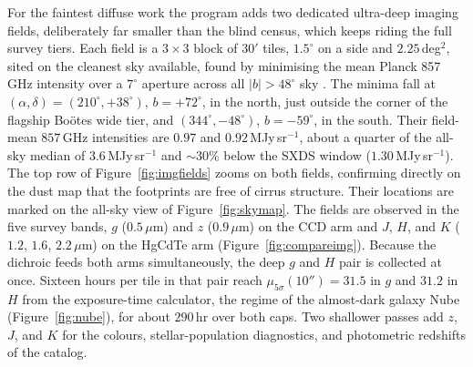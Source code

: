 For the faintest diffuse work the program adds two dedicated ultra-deep imaging fields, deliberately far smaller than the blind census, which keeps riding the full survey tiers. Each field is a $3\times3$ block of $30'$ tiles, $1.5^\circ$ on a side and $2.25$\,deg$^2$, sited on the cleanest sky available, found by minimising the mean Planck 857\,GHz intensity over a $7^\circ$ aperture across all $|b|>48^\circ$ sky \cite{planck2018hfi}. The minima fall at $(\alpha,\delta)=(210^\circ,+38^\circ)$, $b=+72^\circ$, in the north, just outside the corner of the flagship Bo\"otes wide tier, and $(344^\circ,-48^\circ)$, $b=-59^\circ$, in the south. Their field-mean $857$\,GHz intensities are $0.97$ and $0.92$\,MJy\,sr$^{-1}$, about a quarter of the all-sky median of $3.6$\,MJy\,sr$^{-1}$ and $\sim30\%$ below the SXDS window ($1.30$\,MJy\,sr$^{-1}$). The top row of Figure~\ref{fig:imgfields} zooms on both fields, confirming directly on the dust map that the footprints are free of cirrus structure. Their locations are marked on the all-sky view of Figure~\ref{fig:skymap}. The fields are observed in the five survey bands, $g$ ($0.5\,\mu$m) and $z$ ($0.9\,\mu$m) on the CCD arm and $J$, $H$, and $K$ ($1.2$, $1.6$, $2.2\,\mu$m) on the HgCdTe arm (Figure~\ref{fig:compareimg}). Because the dichroic feeds both arms simultaneously, the deep $g$ and $H$ pair is collected at once. Sixteen hours per tile in that pair reach $\mu_{5\sigma}(10'')=31.5$ in $g$ and $31.2$ in $H$ from the exposure-time calculator, the regime of the almost-dark galaxy Nube (Figure~\ref{fig:nube}), for about $290$\,hr over both caps. Two shallower passes add $z$, $J$, and $K$ for the colours, stellar-population diagnostics, and photometric redshifts of the catalog.

